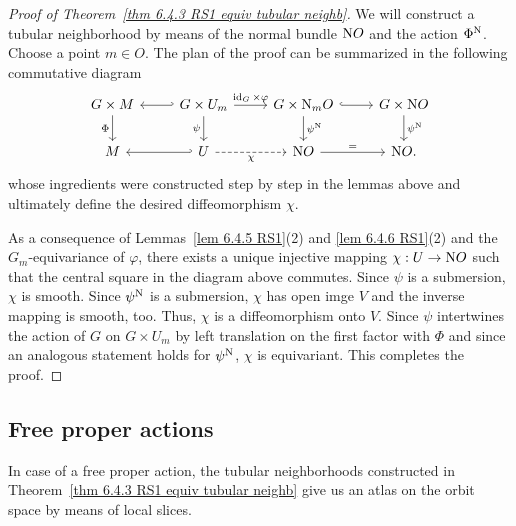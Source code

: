 \begin{proof}[Proof of Theorem~\ref{thm 6.4.3 RS1 equiv tubular neighb}]
    We will construct a tubular neighborhood by means of the normal bundle $\mathrm{N} O$ and the action $\Phi^{\mathrm{N}}$. Choose a point $m\in O$. The plan of the proof can be summarized in the following commutative diagram
    \[
    \begin{tikzcd}[every matrix/.append style={name=m}]
       G\times M\arrow[d,"\Phi",swap]\arrow[hookleftarrow]{r} &  G\times U_m \arrow[r,"\id_G\times \varphi"]\arrow[d,"\psi",swap] & G\times \rmN_mO \arrow[d,"\psi^\rmN"]\arrow[hookrightarrow]{r}& G\times \rmN O\arrow[d,"\psi^\rmN"]\\
       M\arrow[hookleftarrow]{r}&  U \arrow[r,"\chi",dashed,swap] & \rmN O \arrow[r,"="]& \rmN O.
    \end{tikzcd}\label{eq 6.4.1 RS1}
    \]
    whose ingredients were constructed step by step in the lemmas above and ultimately define the desired diffeomorphism $\chi$.

    As a consequence of Lemmas~\ref{lem 6.4.5 RS1}(2) and \ref{lem 6.4.6 RS1}(2) and the $G_m$-equivariance of $\varphi$, there exists a unique injective mapping $\chi:U\to \mathrm{N} O$ such that the central square in the diagram above commutes. Since $\psi$ is a submersion, $\chi$ is smooth. Since $\psi^{\mathrm{N}}$ is a submersion, $\chi$ has open imge $V$ and the inverse mapping is smooth, too. Thus, $\chi$ is a diffeomorphism onto $V$. Since $\psi$ intertwines the action of $G$ on $G\times U_m$ by left translation on the first factor with $\Phi$  and since an analogous statement holds for $\psi^{\mathrm{N}}$, $\chi$ is equivariant. This completes the proof.
\end{proof}




\subsection{Free proper actions}\label{sec: free proper actions}

In case of a free proper action, the tubular neighborhoods constructed in Theorem~\ref{thm 6.4.3 RS1 equiv tubular neighb} give us an atlas on the orbit space by means of local slices.

